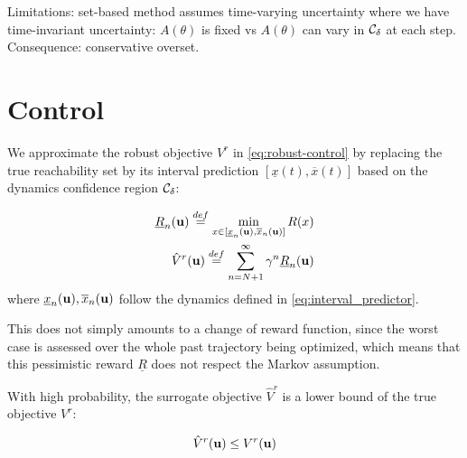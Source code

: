 \documentclass{article}
\begin{document}

Limitations: set-based method assumes time-varying uncertainty where we have time-invariant uncertainty: $A(\theta)$ is fixed vs $A(\theta)$ can vary in $\mathcal{C}_\delta$ at each step. Consequence: conservative overset.

\section{Control}

\label{sec:control}

\begin{definition}
We approximate the robust objective $V^r$ in \eqref{eq:robust-control} by replacing the true reachability set by its interval prediction $[\underline{x}(t), \overline{x}(t)]$ based on the dynamics confidence region $\mathcal{C}_\delta$:

\begin{align}
\underline{R}_n(\mathbf{u}) \stackrel{def}{=} \min_{x\in[\underline{x}_n(\mathbf{u}), \overline{x}_n(\mathbf{u})]}  R(x) \label{eq:pessimistic-rewards} \\
\hat{V}^r(\mathbf{u}) \stackrel{def}{=} \sum_{n=N+1}^\infty \gamma^n \underline{R}_n(\mathbf{u}) \label{eq:surrogate_objective}
\end{align}
where $\underline{x}_n(\mathbf{u}), \overline{x}_n(\mathbf{u})$ follow the dynamics defined in \eqref{eq:interval_predictor}.
\end{definition}

This does not simply amounts to a change of reward function, since the worst case is assessed over the whole past trajectory being optimized, which means that this pessimistic reward $\underline{R}$ does not respect the Markov assumption.

\begin{proposition}
\label{prop:lower-bound}
With high probability, the surrogate objective $\hat{V}^r$ is a lower bound of the true objective $V^r$:

\begin{equation}
\hat{V}^r(\mathbf{u}) \leq V^r(\mathbf{u})
\end{equation}
\end{proposition}
\end{document}
